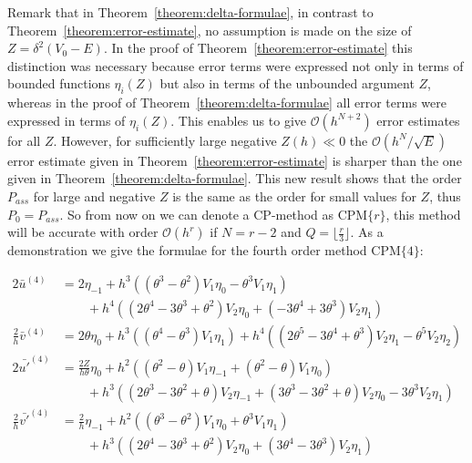 Remark that in Theorem~\ref{theorem:delta-formulae}, in contrast to Theorem~\ref{theorem:error-estimate}, no assumption is made on the size of $Z=\delta^2 (V_0-E)$. In the proof of Theorem~\ref{theorem:error-estimate} this distinction was necessary because error terms were expressed
not only in terms of bounded functions $\eta_i(Z)$ but also in terms of the unbounded argument $Z$, whereas in the proof of
Theorem~\ref{theorem:delta-formulae} all error terms were expressed in terms of $\eta_i(Z)$. This enables us to give $\mathcal{O}(h^{N+2})$ error estimates for all $Z$. However, for sufficiently large negative $Z(h) \ll 0$ the $\mathcal{O}({h^N}/{\sqrt{E}})$ error estimate given in Theorem~\ref{theorem:error-estimate} is sharper than the one given in Theorem~\ref{theorem:delta-formulae}. This new result shows that the order $P_{ass}$ for large and negative $Z$ is the same as the order for small values for $Z$, thus $P_0 = P_{ass}$. So from now on we can denote a CP-method as $\text{CPM}\{r\}$, this method will be accurate with order $\mathcal{O}(h^r)$ if $N=r-2$ and $Q=\lfloor \frac{r}{3} \rfloor$. As a demonstration we give the formulae for the fourth order method $\text{CPM}\{4\}$:

\begin{align*}
    2\bar{u}^{(4)}            & = 2 \eta_{-1} + h^{3}\left(\left(\theta^{3} - \theta^{2}\right) V_{1} \eta_{0} -\theta^{3} V_{1} \eta_{1}\right)                                                                                                 \\
                              & \quad\quad + h^{4}\left(\left(2 \theta^{4} - 3 \theta^{3} + \theta^{2}\right) V_{2} \eta_{0} + \left(-3 \theta^{4} + 3 \theta^{3}\right) V_{2} \eta_{1}\right)                                                   \\
    \frac{2}{h}\bar{v}^{(4)}  & = 2 \theta \eta_{0} + h^{3}\left(\left(\theta^{4} - \theta^{3}\right) V_{1} \eta_{1}\right) + h^{4}\left(\left(2 \theta^{5} - 3 \theta^{4} + \theta^{3}\right) V_{2} \eta_{1} - \theta^{5} V_{2} \eta_{2}\right) \\
    2\bar{u'}^{(4)}           & = \frac{2Z}{h\theta} \eta_0 + h^{2}\left(\left(\theta^{2} - \theta\right) V_{1} \eta_{-1} + \left(\theta^{2} - \theta\right) V_{1} \eta_{0}\right)                                                               \\
                              & \quad\quad+ h^{3}\left(\left(2 \theta^{3} - 3 \theta^{2} + \theta\right) V_{2} \eta_{-1} + \left(3 \theta^{3} - 3 \theta^{2} + \theta\right) V_{2} \eta_{0} - 3 \theta^{3} V_{2} \eta_{1}\right)                 \\
    \frac{2}{h}\bar{v'}^{(4)} & = \frac{2}{h} \eta_{-1} + h^{2}\left(\left(\theta^{3} - \theta^{2}\right) V_{1} \eta_{0} + \theta^{3} V_{1} \eta_{1}\right)                                                                                      \\
                              & \quad\quad + h^{3}\left(\left(2 \theta^{4} - 3 \theta^{3} + \theta^{2}\right) V_{2} \eta_{0} + \left(3 \theta^{4} - 3 \theta^{3}\right) V_{2} \eta_{1}\right)                                                    \\
\end{align*}%

